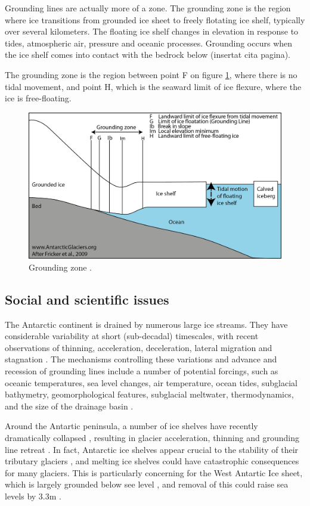 \documentclass[a4paper,12pt]{article}
\begin{document}
Grounding lines are actually more of a zone. The grounding zone is the region where ice transitions from grounded ice sheet to freely flotating ice shelf, typically over several kilometers. The floating ice shelf changes in elevation in response to tides, atmospheric air, pressure and oceanic processes. Grounding occurs when the ice shelf comes into contact with the bedrock below (insertat cita pagina).

The grounding zone is the region between point F on figure \ref{groundingzone}, where there is no tidal movement, and point H, which is the seaward limit of ice flexure, where the ice is free-floating.

\begin{figure}[!h]
	\centering
	\includegraphics[width=0.7\linewidth]{../fig/groundingzone}
	\caption{Grounding zone \cite[]{fricker2009mapping}.}
	\label{groundingzone}
\end{figure}


\subsection{Social and scientific issues}

The Antarctic continent is drained by numerous large ice streams. They have considerable variability at short (sub-decadal) timescales, with recent observations of thinning, acceleration, deceleration, lateral migration and stagnation \cite[]{livingstone2012antarctic}. The mechanisms controlling these variations and advance and recession of grounding lines include a number of potential forcings, such as oceanic temperatures, sea level changes, air temperature, ocean tides, subglacial bathymetry, geomorphological features, subglacial meltwater, thermodynamics, and the size of the drainage basin \cite[]{livingstone2012antarctic}.

Around the Antartic peninsula, a number of ice shelves have recently dramatically collapsed \cite[]{cook2010overview,scambos2009ice}, resulting in glacier acceleration, thinning and grounding line retreat \cite[]{pritchard2007widespread,rignot2004accelerated}. In fact, Antarctic ice shelves appear crucial to the stability of their tributary glaciers \cite[]{pritchard2012antarctic}, and melting ice shelves could have catastrophic consequences for many glaciers. This is particularly concerning for the West Antartic Ice sheet, which is largely grounded below see level \cite[]{lythe2001bedmap}, and removal of this could raise sea levels by 3.3m \cite[]{bamber2009reassessment,mercer1978west}.
\end{document}
